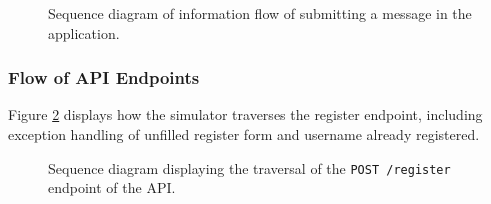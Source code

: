 \documentclass[12pt, a4paper, oneside]{book}
\begin{document}
\begin{figure}[H]
    \centering
    \caption{Sequence diagram of information flow of submitting a message in the application.}
    \label{fig:seq-diagram-infoflow}
\end{figure}

\subsubsection{Flow of API Endpoints}
Figure \ref{fig:seq-diagram-register} displays how the simulator traverses the register endpoint, including exception handling of unfilled register form and username already registered.

\begin{figure}[H]
    \centering
    \caption{Sequence diagram displaying the traversal of the \texttt{POST /register} endpoint of the API.}
    \label{fig:seq-diagram-register}
\end{figure}
\end{document}
